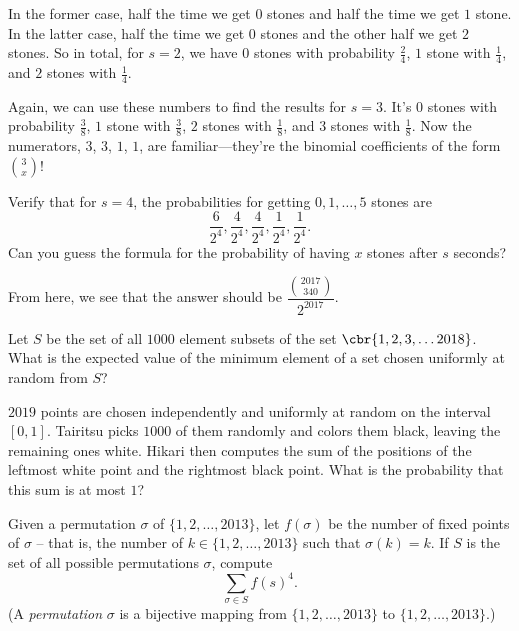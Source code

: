 \documentclass[11pt,paper=letter]{scrartcl}
\begin{document}
In the former case, half the time we get $0$ stones and half the time we get $1$ stone. In the latter case, half the time we get $0$ stones and the other half we get $2$ stones. So in total, for $s = 2$, we have $0$ stones with probability $\frac{2}{4}$, $1$ stone with $\frac{1}{4}$, and $2$ stones with $\frac{1}{4}$.

Again, we can use these numbers to find the results for $s = 3$. It's $0$ stones with probability $\frac{3}{8}$, $1$ stone with $\frac{3}{8}$, $2$ stones with $\frac{1}{8}$, and $3$ stones with $\frac{1}{8}$. Now the numerators, $3$, $3$, $1$, $1$, are familiar---they're the binomial coefficients of the form $\binom{3}{x}$!

\begin{exrboxed}
  Verify that for $s = 4$, the probabilities for getting $0, 1, \ldots, 5$ stones are\[\frac{6}{2^4}, \frac{4}{2^4}, \frac{4}{2^4}, \frac{1}{2^4}, \frac{1}{2^4}.\] Can you guess the formula for the probability of having $x$ stones after $s$ seconds?
\end{exrboxed}

From here, we see that the answer should be $\dfrac{\binom{2017}{340}}{2^{2017}}$.

\begin{mdframed}[style=exmdbox]

\begin{problem}
  Let $S$ be the set of all $1000$ element subsets of the set $\cbr{1, 2, 3, \ldots 2018}$. What is the expected value of the minimum element of a set chosen uniformly at random from $S$?
\end{problem}

\begin{problem}
$2019$ points are chosen independently and uniformly at random on the interval $[0,1]$. Tairitsu picks $1000$ of them randomly and colors them black, leaving the remaining ones white. Hikari then computes the sum of the positions of the leftmost white point and the rightmost black point. What is the probability that this sum is at most $1$?
\end{problem}

\begin{problem}
Given a permutation $\sigma$ of $\{1, 2, \ldots, 2013\}$, let $f(\sigma)$ be the number of fixed points of $\sigma$ -- that is, the number of $k \in \{1, 2, \ldots, 2013\}$ such that $\sigma(k) = k$. If $S$ is the set of all possible permutations $\sigma$, compute
\[
  \sum_{\sigma \in S} f(s)^4.
\]
(A \textit{permutation} $\sigma$ is a bijective mapping from $\{1, 2, \ldots, 2013\}$ to $\{1, 2, \ldots, 2013\}$.) \hint{\ref{h:5}}
\end{problem}


\end{mdframed}
\end{document}
